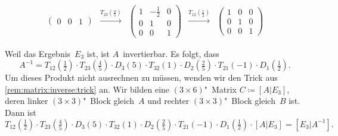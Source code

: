 \documentclass[a4paper]{article}
\begin{document}
\begin{align*}
\begin{pmatrix}
           0 & 0            & 1
       \end{pmatrix} &
    \xrightarrow{T_{23}(\frac{4}{5})}
     & \begin{pmatrix}
           1 & -\frac{1}{2} & 0 \\
           0 & 1            & 0 \\
           0 & 0            & 1
       \end{pmatrix}            &
    \xrightarrow{T_{12}(\frac{1}{2})}
     & \begin{pmatrix}
           1 & 0 & 0 \\
           0 & 1 & 0 \\
           0 & 0 & 1
       \end{pmatrix}
\end{align*}

Weil das Ergebnis~$E_3$ ist, ist $A$~invertierbar. Es folgt, dass
\begin{equation*}
    A^{-1} = T_{12}(\tfrac{1}{2}) \cdot T_{23}(\tfrac{4}{5}) \cdot D_3(5) \cdot T_{32}(1) \cdot D_2(\tfrac{2}{5}) \cdot T_{21}(-1) \cdot D_1(\tfrac{1}{2}).
\end{equation*}
Um dieses Produkt nicht ausrechnen zu müssen, wenden wir den Trick aus \cref{rem:matrix:inverse:trick} an. Wir bilden eine $(3\times6)$"~Matrix $C \coloneqq [A|E_3]$, deren linker $(3\times3)$"~Block gleich~$A$ und rechter $(3\times3)$"~Block gleich~$B$ ist. Dann ist
\begin{equation*}
    T_{12}(\tfrac{1}{2}) \cdot T_{23}(\tfrac{4}{5}) \cdot D_3(5) \cdot T_{32}(1) \cdot D_2(\tfrac{2}{5}) \cdot T_{21}(-1) \cdot D_1(\tfrac{1}{2}) \cdot [A|E_3] = [E_3|A^{-1}].
\end{equation*}
\end{document}
